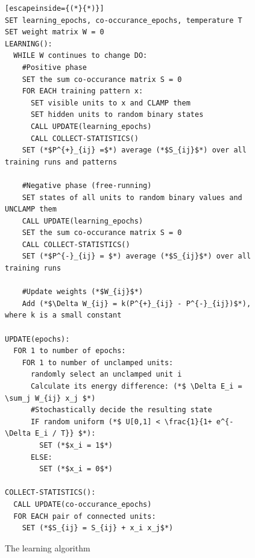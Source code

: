 \documentclass[12pt,twoside]{article}
\theoremstyle{plain}
\theoremstyle{definition}
\theoremstyle{remark}
\begin{document}
\begin{figure}[h]
\begin{lstlisting}[escapeinside={(*}{*)}]
SET learning_epochs, co-occurance_epochs, temperature T
SET weight matrix W = 0
LEARNING():
  WHILE W continues to change DO:
    #Positive phase
    SET the sum co-occurance matrix S = 0
    FOR EACH training pattern x:
      SET visible units to x and CLAMP them
      SET hidden units to random binary states
      CALL UPDATE(learning_epochs)
      CALL COLLECT-STATISTICS()
    SET (*$P^{+}_{ij} =$*) average (*$S_{ij}$*) over all training runs and patterns

    #Negative phase (free-running)
    SET states of all units to random binary values and UNCLAMP them
    CALL UPDATE(learning_epochs)
    SET the sum co-occurance matrix S = 0
    CALL COLLECT-STATISTICS()
    SET (*$P^{-}_{ij} = $*) average (*$S_{ij}$*) over all training runs

    #Update weights (*$W_{ij}$*)
    Add (*$\Delta W_{ij} = k(P^{+}_{ij} - P^{-}_{ij})$*), where k is a small constant

UPDATE(epochs):
  FOR 1 to number of epochs:
    FOR 1 to number of unclamped units:
      randomly select an unclamped unit i
      Calculate its energy difference: (*$ \Delta E_i = \sum_j W_{ij} x_j $*)
      #Stochastically decide the resulting state
      IF random uniform (*$ U[0,1] < \frac{1}{1+ e^{- \Delta E_i / T}} $*):
        SET (*$x_i = 1$*)
      ELSE:
        SET (*$x_i = 0$*)

COLLECT-STATISTICS():
  CALL UPDATE(co-occurance_epochs)
  FOR EACH pair of connected units:
    SET (*$S_{ij} = S_{ij} + x_i x_j$*)
\end{lstlisting}
\caption{The learning algorithm}
\label{fig:learning-alg}
\end{figure}
\end{document}
